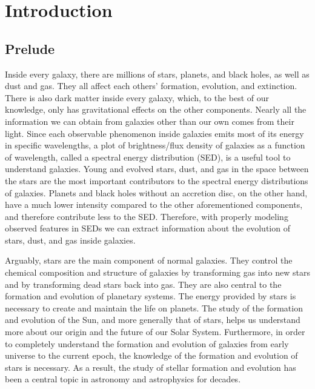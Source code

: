 
\chapter{Introduction}
\label{chap:intro}

\section{Prelude}
\label{sec: overview}
Inside every galaxy, there are millions of stars, planets, and black holes, as well as dust and gas.
They all affect each others' formation, evolution, and extinction.
There is also dark matter inside every galaxy, which, to the best of our knowledge, only has gravitational effects on the other components.
Nearly all the information we can obtain from galaxies other than our own comes from their light.
Since each observable phenomenon inside galaxies emits most of its energy in specific wavelengths, 
a plot of brightness/flux density of galaxies as a function of wavelength, called a spectral energy distribution (SED), is a useful tool to understand galaxies. 
Young and evolved stars, dust, and gas in the space between the stars are the most important contributors to the spectral energy distributions of galaxies.
Planets and black holes without an accretion disc, on the other hand, have a much lower intensity compared to the other aforementioned components, and therefore contribute less to the SED.
Therefore, with properly modeling observed features in SEDs we can extract information about the evolution of stars, dust, and gas inside galaxies. %

Arguably, stars are the main component of normal galaxies.
They control the chemical composition and structure of galaxies by transforming gas into new stars and by transforming dead stars back into gas.
They are also central to the formation and evolution of planetary systems.
The energy provided by stars is necessary to create and maintain the life on planets. 
The study of the formation and evolution of the Sun, and more generally that of stars, helps us understand more about our origin and the future of our Solar System.
Furthermore, in order to completely understand the formation and evolution of galaxies from early universe to the current epoch, the knowledge of the formation and evolution of stars is necessary. 
As a result, the study of stellar formation and evolution has been a central topic in astronomy and astrophysics for decades.

